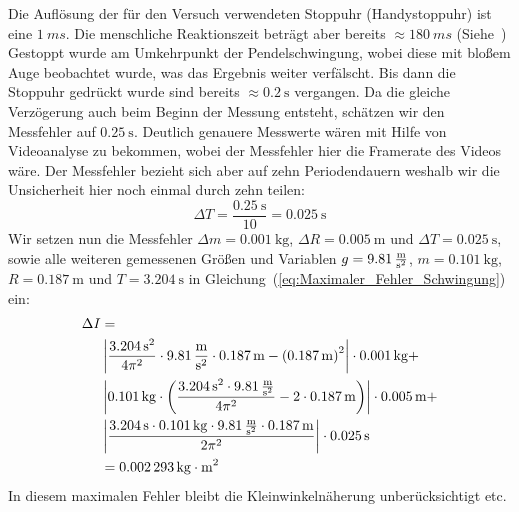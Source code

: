 \documentclass{article}
\begin{document}
	Die Auflösung der für den Versuch verwendeten Stoppuhr (Handystoppuhr) ist eine \(\SI{1}{ms}\).
	Die menschliche Reaktionszeit beträgt aber bereits \(\approx \SI{180}{ms} \) (Siehe~\cite{Reaktionszeit})
	Gestoppt wurde am Umkehrpunkt der Pendelschwingung, wobei diese mit bloßem Auge beobachtet wurde, was das Ergebnis weiter verfälscht.
	Bis dann die Stoppuhr gedrückt wurde sind bereits \(\approx \SI{0,2}{\second}\) vergangen.
	Da die gleiche Verzögerung auch beim Beginn der Messung entsteht, schätzen wir den Messfehler auf \(\SI{0,25}{\second}\).
	Deutlich genauere Messwerte wären mit Hilfe von Videoanalyse zu bekommen, wobei der Messfehler hier die Framerate des Videos wäre.
	Der Messfehler bezieht sich aber auf zehn Periodendauern weshalb wir die Unsicherheit hier noch einmal durch zehn teilen:
	\begin{equation}
		\Delta T = \frac{\SI{0,25}{\second}}{10} = \SI{0,025}{\second}
	\end{equation}
	Wir setzen nun die Messfehler \( \Delta m = \SI{0,001}{\kilogram} \), \( \Delta R = \SI{0,005}{\metre} \) und \(\Delta T = \SI{0,025}{\second} \), sowie alle weiteren gemessenen Größen und Variablen
	\(g = \SI{9,81}{\frac{\metre}{\second^2}} \), \(m = \SI{0,101}{\kilogram} \), \(R = \SI{0,187}{\metre} \) und \( T = \SI{3,204}{\second} \) in Gleichung~(\ref{eq:Maximaler_Fehler_Schwingung}) ein:
	\begin{equation}
		\begin{aligned}
			\Delta I & =                                                                                                                                                                                                     \\
			         & \left| \frac{ {\SI{3,204}{\second}}^2 }{4 \pi^2} \cdot \SI{9,81}{\frac{\metre}{\second^2}} \cdot \SI{0,187}{\metre} - {\left(\SI{0,187}{\metre}\right)}^2 \right| \cdot \SI{0,001}{\kilogram} +       \\
			         & \left| \SI{0,101}{\kilogram} \cdot \left( \frac{ {\SI{3,204}{\second}}^2 \cdot \SI{9,81}{\frac{\metre}{\second^2}} }{4 \pi^2} - 2 \cdot \SI{0,187}{\metre} \right) \right| \cdot \SI{0,005}{\metre} + \\
			         & \left| \frac{ \SI{3,204}{\second} \cdot \SI{0,101}{\kilogram} \cdot \SI{9,81}{\frac{\metre}{\second^2}} \cdot \SI{0,187}{\metre} }{2 \pi^2 } \right| \cdot \SI{0,025}{\second}                        \\
			         & = \SI{0.002293}{ \kilogram \cdot \metre^2 }
		\end{aligned}
	\end{equation}
	In diesem maximalen Fehler bleibt die Kleinwinkelnäherung unberücksichtigt etc.
\end{document}
